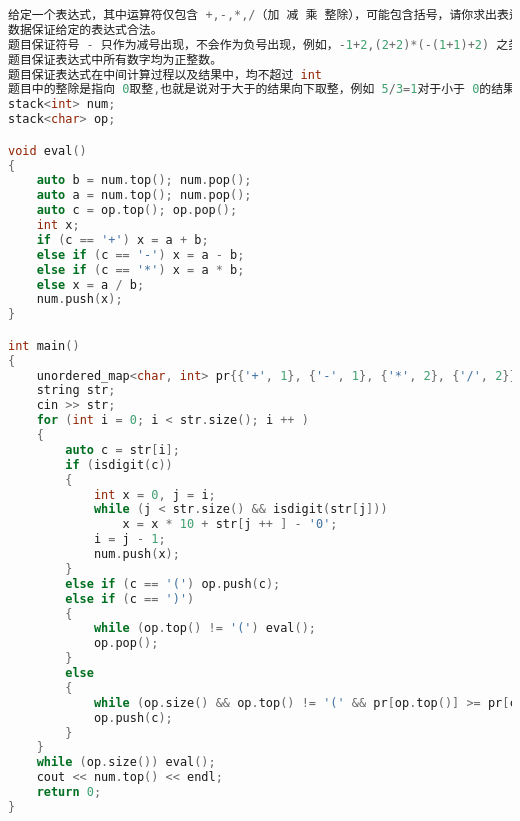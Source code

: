 \begin{lstlisting}[language=C++]
给定一个表达式，其中运算符仅包含 +,-,*,/（加 减 乘 整除），可能包含括号，请你求出表达式的最终值。
数据保证给定的表达式合法。
题目保证符号 - 只作为减号出现，不会作为负号出现，例如，-1+2,(2+2)*(-(1+1)+2) 之类表达式均不会出现。
题目保证表达式中所有数字均为正整数。
题目保证表达式在中间计算过程以及结果中，均不超过 int
题目中的整除是指向 0取整,也就是说对于大于的结果向下取整，例如 5/3=1对于小于 0的结果向上取整,例如 5/(1-4)=-1
stack<int> num;
stack<char> op;

void eval()
{
    auto b = num.top(); num.pop();
    auto a = num.top(); num.pop();
    auto c = op.top(); op.pop();
    int x;
    if (c == '+') x = a + b;
    else if (c == '-') x = a - b;
    else if (c == '*') x = a * b;
    else x = a / b;
    num.push(x);
}

int main()
{
    unordered_map<char, int> pr{{'+', 1}, {'-', 1}, {'*', 2}, {'/', 2}};
    string str;
    cin >> str;
    for (int i = 0; i < str.size(); i ++ )
    {
        auto c = str[i];
        if (isdigit(c))
        {
            int x = 0, j = i;
            while (j < str.size() && isdigit(str[j]))
                x = x * 10 + str[j ++ ] - '0';
            i = j - 1;
            num.push(x);
        }
        else if (c == '(') op.push(c);
        else if (c == ')')
        {
            while (op.top() != '(') eval();
            op.pop();
        }
        else
        {
            while (op.size() && op.top() != '(' && pr[op.top()] >= pr[c]) eval();
            op.push(c);
        }
    }
    while (op.size()) eval();
    cout << num.top() << endl;
    return 0;
}
\end{lstlisting}
